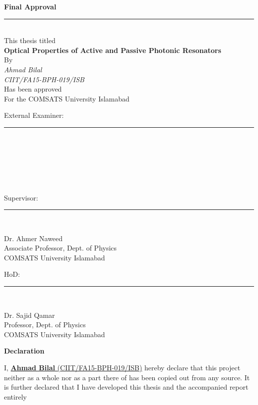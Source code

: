 \documentclass[12pt,twoside]{report}
\begin{document}
	\begin{center}
		\textbf{\Large{Final Approval}}
		\noindent\rule{15cm}{1pt} \\

		This thesis titled\\
		\vspace{0.5cm}
{\Large \textbf {Optical Properties of Active and Passive Photonic Resonators}}\\
\vspace{0.3cm}
By\\
\emph{Ahmad Bilal}\\
\emph{CIIT/FA15-BPH-019/ISB}\\
\vspace{0.1 in}
Has been approved\\
\vspace{0.1 in}
For the COMSATS University Islamabad\\
\end{center}
\vspace{0.5cm}
External Examiner: \noindent\rule{8cm}{0.4pt}\\\\\\\\\\\\
Supervisor: \hspace{1.35cm}\noindent\rule{8cm}{0.4pt}\\
\begin{center}
	Dr. Ahmer Naweed\\
	Associate Professor, Dept. of Physics\\
	COMSATS University Islamabad\\
\end{center}
\vspace{0.5cm}
HoD: \hspace{2.5cm}\noindent\rule{8cm}{0.4pt}\\
\begin{center}
	Dr. Sajid Qamar\\
	Professor, Dept. of Physics\\
	COMSATS University Islamabad
\end{center}
	\newpage
	\begin{center}
		\textbf{\Large{Declaration}}
		\end{center}
I, \underline{\textbf{Ahmad Bilal} (CIIT/FA15-BPH-019/ISB)} hereby declare that this project
neither as a whole nor as a part there of has been copied out from any source. It is
further declared that I have developed this thesis and the accompanied report entirely
\end{document}
